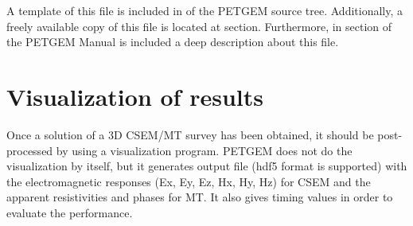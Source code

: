 \documentclass[letterpaper,10pt,english]{sphinxmanual}
\begin{document}
A template of this file is included in 
of the PETGEM source tree. Additionally, a freely available copy of this file
is located at {\hyperref[\detokenize{Download:download}]{}} section. Furthermore, in
{\hyperref[\detokenize{Manual:running-a-simulation-manual}]{}} section of the PETGEM Manual is included
a deep description about this file.


\section{Visualization of results}
\label{\detokenize{Tutorial:visualization-of-results}}\label{\detokenize{Tutorial:visualization-of-results-tutorial}}
Once a solution of a 3D CSEM/MT survey has been obtained, it should be
post-processed by using a visualization program. PETGEM does not do the
visualization by itself, but it generates output file (hdf5 format is supported)
with the electromagnetic responses (Ex, Ey, Ez, Hx, Hy, Hz) for CSEM and the
apparent resistivities and phases for MT. It also gives timing values
in order to evaluate the performance.
\end{document}
